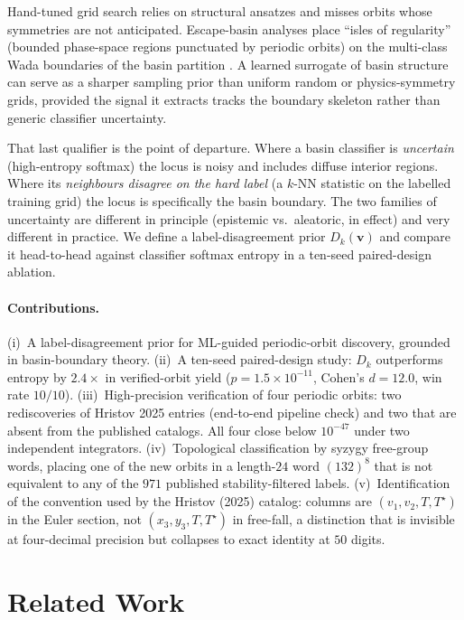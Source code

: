 \documentclass[10pt]{article}
\newcommand{\vvec}{\mathbf{v}}
\newcommand{\Tstar}{T^{\star}}
\begin{document}
Hand-tuned grid search relies on structural ansatzes and misses orbits
whose symmetries are not anticipated. Escape-basin analyses
\citep{Trani2024, Manwadkar2021} place ``isles of regularity''
(bounded phase-space regions punctuated by periodic orbits) on the
multi-class Wada boundaries of the basin partition
\citep{GOY1983, MGOY1985, Aguirre2001, Poon1996, NusseYorke1992}. A
learned surrogate of basin structure can serve as a sharper sampling
prior than uniform random or physics-symmetry grids, provided the
signal it extracts tracks the boundary skeleton rather than generic
classifier uncertainty.

That last qualifier is the point of departure. Where a basin
classifier is \emph{uncertain} (high-entropy softmax) the locus is
noisy and includes diffuse interior regions. Where its
\emph{neighbours disagree on the hard label} (a $k$-NN statistic on
the labelled training grid) the locus is specifically the basin
boundary. The two families of uncertainty are different in principle
(epistemic vs.\ aleatoric, in effect) and very different in practice.
We define a label-disagreement prior $D_k(\vvec)$ and compare it
head-to-head against classifier softmax entropy in a ten-seed
paired-design ablation.

\paragraph{Contributions.}
(i)~A label-disagreement prior for ML-guided periodic-orbit discovery,
grounded in basin-boundary theory.
(ii)~A ten-seed paired-design study: $D_k$ outperforms entropy by
$2.4\times$ in verified-orbit yield ($p = 1.5\!\times\!10^{-11}$,
Cohen's $d = 12.0$, win rate $10/10$).
(iii)~High-precision verification of four periodic orbits: two
rediscoveries of Hristov 2025 entries (end-to-end pipeline check) and
two that are absent from the published catalogs. All four close below
$10^{-47}$ under two independent integrators.
(iv)~Topological classification by syzygy free-group words, placing
one of the new orbits in a length-$24$ word $(132)^{8}$ that is not
equivalent to any of the $971$ published stability-filtered labels.
(v)~Identification of the convention used by the Hristov (2025)
catalog: columns are $(v_1, v_2, T, \Tstar)$ in the Euler section, not
$(x_3, y_3, T, \Tstar)$ in free-fall, a distinction that is invisible
at four-decimal precision but collapses to exact identity at $50$
digits.

\section{Related Work}
\end{document}
